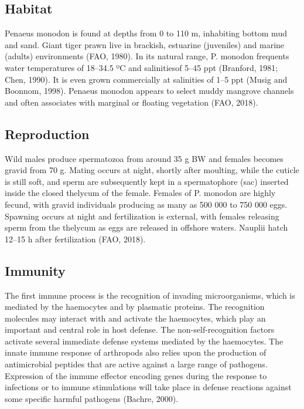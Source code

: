 \documentclass[
]{book}
\begin{document}
\hypertarget{habitat}{%
\subsection{Habitat}\label{habitat}}

Penaeus monodon is found at depths from 0 to 110 m, inhabiting bottom
mud and sand. Giant tiger prawn live in brackish, estuarine (juveniles)
and marine (adults) environments (FAO, 1980). In its natural range, P.
monodon frequents water temperatures of 18--34.5 ºC and salinitiesof
5--45 ppt (Branford, 1981; Chen, 1990). It is even grown commercially at
salinities of 1--5 ppt (Musig and Boonnom, 1998). Penaeus monodon
appears to select muddy mangrove channels and often associates with
marginal or floating vegetation (FAO, 2018).

\hypertarget{reproduction}{%
\subsection{Reproduction}\label{reproduction}}

Wild males produce spermatozoa from around 35 g BW and females becomes
gravid from 70 g. Mating occurs at night, shortly after moulting, while
the cuticle is still soft, and sperm are subsequently kept in a
spermatophore (sac) inserted inside the closed thelycum of the female.
Females of P. monodon are highly fecund, with gravid individuals
producing as many as 500 000 to 750 000 eggs. Spawning occurs at night
and fertilization is external, with females releasing sperm from the
thelycum as eggs are released in offshore waters. Nauplii hatch 12--15 h
after fertilization (FAO, 2018).

\hypertarget{immunity}{%
\subsection{Immunity}\label{immunity}}

The first immune process is the recognition of invading microorganisms,
which is mediated by the haemocytes and by plasmatic proteins. The
recognition molecules may interact with and activate the haemocytes,
which play an important and central role in host defense. The
non-self-recognition factors activate several immediate defense systems
mediated by the haemocytes. The innate immune response of arthropods
also relies upon the production of antimicrobial peptides that are
active against a large range of pathogens. Expression of the immune
effector encoding genes during the response to infections or to immune
stimulations will take place in defense reactions against some specific
harmful pathogens (Bachre, 2000).
\end{document}

